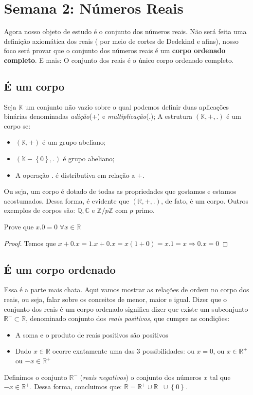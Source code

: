\section{Semana 2: Números Reais}
Agora nosso objeto de estudo é o conjunto dos números reais. Não será feita uma definição axiomática dos reais ( por meio de cortes de Dedekind e afins), nosso foco será provar que o conjunto dos números reais é um \textbf{corpo ordenado completo}. E mais: O conjunto dos reais é o único corpo ordenado completo.

\subsection{É um corpo}
Seja $\mathbb{K}$ um conjunto não vazio sobre o qual podemos definir duas aplicações binárias denominadas \textit{adição}(+) e \textit{multiplicação}(.); A estrutura $(\mathbb{K},+,.)$ é um corpo se: \begin{itemize}
    \item $(\mathbb{K},+)$ é um grupo abeliano;
    \item $(\mathbb{K}-\left\{0\right\},.)$ é grupo abeliano;
    \item A operação $.$ é distributiva em relação a $+$.
\end{itemize}

Ou seja, um corpo é dotado de todas as propriedades que gostamos e estamos acostumados. Dessa forma, é evidente que $(\mathbb{R},+,.)$, de fato, é um corpo. Outros exemplos de corpos são: $\mathbb{Q},\mathbb{C}$ e $\mathbb{Z}/p\mathbb{Z}$ com $p$ primo.

\begin{prob}
Prove que $x.0=0$ $\forall x \in \mathbb{R}$
\end{prob}
\begin{proof}
Temos que $x+0.x=1.x+0.x=x(1+0)=x.1=x \Rightarrow 0.x=0$
\end{proof}



\subsection{É um corpo ordenado}
Essa é a parte mais chata. Aqui vamos mostrar as relações de ordem no corpo dos reais, ou seja, falar sobre os conceitos de menor, maior e igual.
Dizer que o conjunto dos reais é um corpo ordenado significa dizer que existe um subconjunto $\mathbb{R}^{+} \subset \mathbb{R}$, denominado conjunto dos \textit{reais positivos}, que cumpre as condições:
\begin{itemize}
    \item A soma e o produto de reais positivos são positivos
    \item Dado $x \in \mathbb{R}$ ocorre exatamente uma das 3 possibilidades: ou $x=0$, ou $x \in \mathbb{R}^{+}$ ou $-x \in \mathbb{R}^{+}$
\end{itemize}
Definimos o conjunto $\mathbb{R}^{-}$ (\textit{reais negativos}) o conjunto dos números $x$ tal que $-x \in \mathbb{R}^{+}$. Dessa forma, concluimos que: $\mathbb{R}=\mathbb{R}^{+} \cup \mathbb{R}^{-}\cup\left\{0\right\}$.


